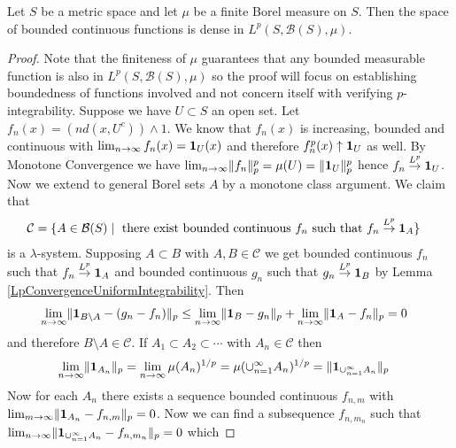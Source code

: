 \begin{lem}\label{LpApproximationByContinuous}Let $S$ be a metric
  space and let $\mu$ be a finite Borel measure on $S$.  Then the
 space of bounded continuous functions is dense in $L^p(S,
  \mathcal{B}(S), \mu)$.
\end{lem}
\begin{proof}
Note that the finiteness of $\mu$ guarantees that any bounded
measurable function is also in $L^p(S, \mathcal{B}(S), \mu)$ so the
proof will focus on establishing boundedness of functions involved and
not concern itself with verifying $p$-integrability.  Suppose we have $U \subset S$ an open set.  Let
$f_n(x) = (nd(x,U^c)) \wedge 1$.  We know that $f_n(x)$ is 
increasing, bounded and continuous with $\lim_{n \to \infty} f_n(x) =
\textbf{1}_{U}(x)$ and therefore $ f^p_n(x) \uparrow
\textbf{1}_{U}$ as well.  By Monotone Convergence we have $\lim_{n \to
  \infty} \lVert f_n \rVert_p^p  = \mu(U) = \lVert \textbf{1}_{U} \rVert_p^p$
hence $f_n \overset{L^p}\to \textbf{1}_{U}$.  Now we
extend to general Borel sets $A$ by a monotone class argument.  We claim
that 
\begin{align*}
\mathcal{C} &= \lbrace A \in \mathcal{B}(S) \mid \text{ there
  exist bounded continuous } f_n \text{ such that } f_n \overset{L^p}\to
\textbf{1}_{A} \rbrace
\end{align*}
is a $\lambda$-system.  Supposing $A \subset B$ with $A,B \in
\mathcal{C}$ we get bounded continuous $f_n$ such that $f_n \overset{L^p}\to
\textbf{1}_{A}$ and bounded continuous $g_n$ such that $g_n \overset{L^p}\to
\textbf{1}_{B}$ by Lemma \ref{LpConvergenceUniformIntegrability}.
Then
\begin{align*}
\lim_{n \to \infty} \lVert \textbf{1}_{B\setminus A} - (g_n
  -f_n) \rVert_p & \leq \lim_{n \to \infty} \lVert \textbf{1}_{B} -
  g_n \rVert_p   + \lim_{n \to \infty} \lVert \textbf{1}_{A} -
  f_n \rVert_p = 0
\end{align*}
and therefore $B \setminus A \in \mathcal{C}$.  
If $A_1 \subset A_2 \subset \dotsb$ with $A_n \in \mathcal{C}$ then 
\begin{align*}
\lim_{n \to \infty} \lVert \textbf{1}_{A_n} \rVert_p &= \lim_{n \to
  \infty} \mu(A_n)^{1/p} = \mu(\cup_{n=1}^\infty A_n) ^{1/p} = \lVert \textbf{1}_{\cup_{n=1}^\infty A_n} \rVert_p
\end{align*}
Now for each $A_n$ there exists a sequence bounded continuous $f_{n,m}$ with $\lim_{m \to
  \infty} \lVert \textbf{1}_{A_n} - f_{n,m} \rVert_p = 0$.  Now we can
find a subsequence $f_{n,m_n}$ such that $\lim_{n \to \infty}
\lVert \textbf{1}_{\cup_{n=1}^\infty A_n} - f_{n,m_n} \rVert_p = 0$ which

\end{proof}
